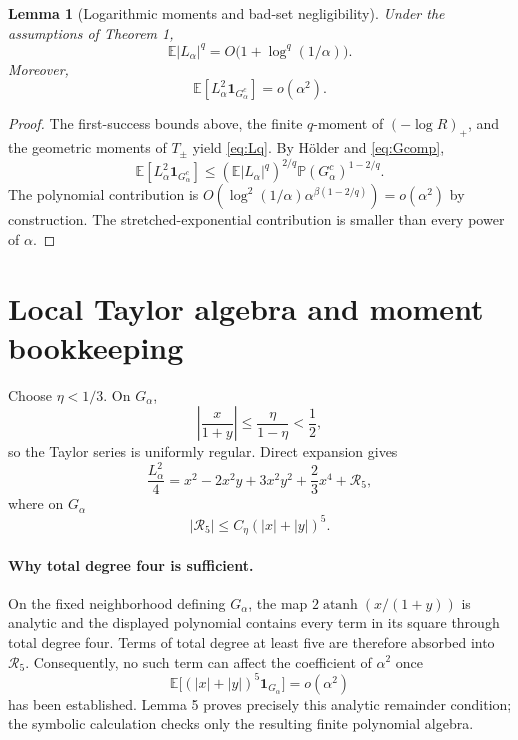 \documentclass[11pt,a4paper]{article}
\newtheorem{lemma}{Lemma}
\newcommand{\E}{\mathbb E}
\newcommand{\Prob}{\mathbb P}
\newcommand{\atanh}{\operatorname{atanh}}
\begin{document}
\begin{lemma}[Logarithmic moments and bad-set negligibility]
Under the assumptions of Theorem 1,
\begin{equation}\label{eq:Lq}
\E|L_\alpha|^q=O\bigl(1+\log^q(1/\alpha)\bigr).
\end{equation}
Moreover,
\begin{equation}\label{eq:badL2}
\E\left[L_\alpha^2\mathbf 1_{G_\alpha^c}\right]=o(\alpha^2).
\end{equation}
\end{lemma}

\begin{proof}
The first-success bounds above, the finite $q$-moment of $(-\log R)_+$, and the geometric moments of $T_\pm$ yield \eqref{eq:Lq}.  By H\"older and \eqref{eq:Gcomp},
\[
\E[L_\alpha^2\mathbf 1_{G_\alpha^c}]
\le (\E|L_\alpha|^q)^{2/q}\Prob(G_\alpha^c)^{1-2/q}.
\]
The polynomial contribution is
$O(\log^2(1/\alpha)\alpha^{\beta(1-2/q)})=o(\alpha^2)$ by construction.
The stretched-exponential contribution is smaller than every power of
$\alpha$.
\end{proof}

\section{Local Taylor algebra and moment bookkeeping}
Choose $\eta<1/3$.  On $G_\alpha$,
\[
\left|\frac{x}{1+y}\right|\le \frac{\eta}{1-\eta}<\frac12,
\]
so the Taylor series is uniformly regular.  Direct expansion gives
\begin{equation}\label{eq:taylor}
\frac{L_\alpha^2}{4}
=x^2-2x^2y+3x^2y^2+\frac23x^4+\mathcal R_5,
\end{equation}
where on $G_\alpha$
\[
|\mathcal R_5|\le C_\eta(|x|+|y|)^5.
\]

\paragraph{Why total degree four is sufficient.}
On the fixed neighborhood defining $G_\alpha$, the map
$2\atanh(x/(1+y))$ is analytic and the displayed polynomial contains every
term in its square through total degree four.  Terms of total degree at least
five are therefore absorbed into $\mathcal R_5$.  Consequently, no such term
can affect the coefficient of $\alpha^2$ once
\[
\E\bigl[(|x|+|y|)^5\mathbf 1_{G_\alpha}\bigr]=o(\alpha^2)
\]
has been established.  Lemma 5 proves precisely this analytic remainder
condition; the symbolic calculation checks only the resulting finite polynomial
algebra.
\end{document}

